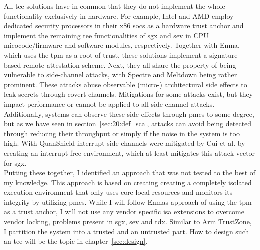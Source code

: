 All \gls{tee} solutions have in common that they do not implement the whole
functionality exclusively in hardware. For example, Intel and AMD employ
dedicated security processors in their x86 \glspl{soc} as a hardware trust
anchor and implement the remaining \gls{tee} functionalities of \gls{sgx} and
\gls{sev} in CPU micocode/firmware and software modules, respectively. Together
with Enma, which uses the \gls{tpm} as a root of trust, these solutions
implement a signature-based remote attestation scheme. Next, they all share the
property of being vulnerable to side-channel attacks, with Spectre and Meltdown
being rather prominent. These attacks abuse observable (micro-) architectural
side effects to leak secrets through covert channels. Mitigations for some
attacks exist, but they impact performance or cannot be applied to all
side-channel attacks. Additionally, systems can observe these side effects
through \glspl{pmc} to some degree, but as we have seen in
section~\ref{sec:20:def_sca}, attacks can avoid being detected through reducing
their throughput or simply if the noise in the system is too high. With
QuanShield interrupt side channels were mitigated by Cui et al. by creating an
interrupt-free environment, which at least mitigates this attack vector for
\gls{sgx}.\\

Putting these together, I identified an approach that was not tested to the best
of my knowledge. This approach is based on creating creating a completely
isolated execution environment that only uses core local resources and monitors
its integrity by utilizing \glspl{pmc}. While I will follow Enmas approach of
using the \gls{tpm} as a trust anchor, I will not use any vendor specific
\gls{isa} extensions to overcome vendor locking, problems present in \gls{sgx},
\gls{sev} and \gls{tdx}. Similar to Arm TrustZone, I partition the system into a
trusted and an untrusted part. How to design such an \gls{tee} will be the topic
in chapter~\ref{sec:design}.


